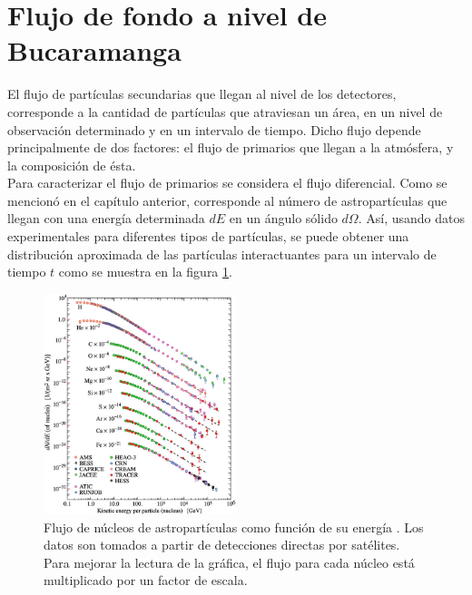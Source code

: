 
\section{Flujo de fondo a nivel de Bucaramanga}

El flujo de partículas secundarias que llegan al nivel de los detectores, corresponde a la cantidad de partículas que atraviesan un área, en un nivel de observación determinado y en un intervalo de tiempo. Dicho flujo depende principalmente de dos factores: el flujo de primarios que llegan a la atmósfera, y la composición de ésta.\\

Para caracterizar el flujo de primarios se considera el flujo diferencial. Como se mencionó en el capítulo anterior, corresponde al n\'umero de astropartículas que llegan con una energía determinada $dE$ en un ángulo sólido $d\Omega$. Así, usando datos experimentales para diferentes tipos de partículas,  se puede obtener una distribución aproximada de las partículas interactuantes para un intervalo de tiempo $t$ como se muestra en la figura \ref{fig:fig8}. \\
\begin{figure}[htb!]
\centering
\includegraphics[width=0.5\textwidth]{Figs/differential_flux_by_nuclei.png}
\caption[Flujo de astropartículas como función de su energía.]{Flujo de núcleos de astropartículas como función de su energía  \citep{mauro:oxigen}. Los datos son tomados a partir de detecciones directas por satélites. Para mejorar la lectura de la gráfica, el flujo para cada núcleo está multiplicado por un factor de escala.}
 \label{fig:fig8}
\end{figure}

\newpage


